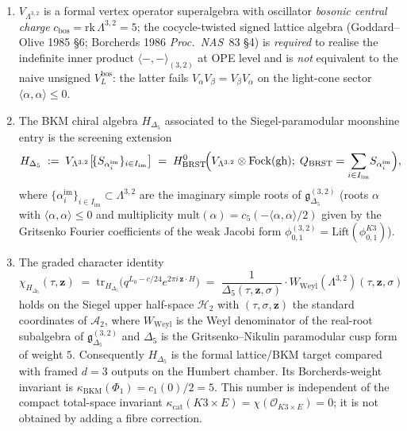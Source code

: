 \begin{proposition}
\begin{enumerate}
\item[\textup{(i)}] $V_{\Lambda^{3,2}}$ is a formal vertex operator
 superalgebra with oscillator \emph{bosonic central charge}
 $c_{\mathrm{bos}} = \mathrm{rk}\,\Lambda^{3,2} = 5$; the
 cocycle-twisted signed lattice algebra (Goddard--Olive 1985
 \S6; Borcherds 1986 \emph{Proc.\ NAS}~83 \S4) is \emph{required}
 to realise the indefinite inner product $\langle-,-\rangle_{(3,2)}$
 at OPE level and is \emph{not} equivalent to the naive unsigned
 $V_L^{\mathrm{bos}}$: the latter fails $V_\alpha V_\beta = V_\beta V_\alpha$
 on the light-cone sector $\langle\alpha,\alpha\rangle \leq 0$.
\item[\textup{(ii)}] The BKM chiral algebra $H_{\Delta_5}$ associated
 to the Siegel-paramodular moonshine entry is the screening extension
 \begin{equation}
 \label{eq:k3ca-H-Delta5-32-def}
 H_{\Delta_5}
 \;:=\;
 V_{\Lambda^{3,2}}\bigl[\!\{S_{\alpha_i^{\mathrm{im}}}\}_{i\in I_{\mathrm{im}}}\bigr]
 \;=\;
 H^0_{\mathrm{BRST}}\!\Bigl(V_{\Lambda^{3,2}}\otimes
 \mathrm{Fock}(\mathrm{gh});\;
 Q_{\mathrm{BRST}} = \sum_{i\in I_{\mathrm{im}}}\!S_{\alpha_i^{\mathrm{im}}}\Bigr),
 \end{equation}
 where $\{\alpha_i^{\mathrm{im}}\}_{i\in I_{\mathrm{im}}}\subset\Lambda^{3,2}$
 are the imaginary simple roots of $\mathfrak g_{\Delta_5}^{(3,2)}$
 (roots $\alpha$ with $\langle\alpha,\alpha\rangle\leq 0$ and
 multiplicity $\mathrm{mult}(\alpha) = c_5(-\langle\alpha,\alpha\rangle/2)$
 given by the Gritsenko Fourier coefficients of the weak Jacobi form
 $\phi^{(3,2)}_{0,1} = \mathrm{Lift}(\phi^{K3}_{0,1})$).
\item[\textup{(iii)}] The graded character identity
 \begin{equation}
 \label{eq:k3ca-character-Delta5-32}
 \chi_{H_{\Delta_5}}(\tau,\mathbf z)
 \;=\;
 \mathrm{tr}_{H_{\Delta_5}}\!\bigl(q^{L_0-c/24}e^{2\pi i\,\mathbf z\cdot H}\bigr)
 \;=\;
 \frac{1}{\Delta_5(\tau,\mathbf z,\sigma)}
 \cdot W_{\mathrm{Weyl}}(\Lambda^{3,2})(\tau,\mathbf z,\sigma)
 \end{equation}
 holds on the Siegel upper half-space $\mathcal H_2$ with
 $(\tau,\sigma,\mathbf z)$ the standard coordinates of $\mathcal A_2$,
 where $W_{\mathrm{Weyl}}$ is the Weyl denominator of the real-root
 subalgebra of $\mathfrak g_{\Delta_5}^{(3,2)}$ and
 $\Delta_5$ is the Gritsenko--Nikulin paramodular cusp form of
 weight $5$. Consequently $H_{\Delta_5}$ is the formal lattice/BKM target
 compared with framed $d=3$ outputs on the Humbert chamber.  Its
 Borcherds-weight invariant is
 $\kappa_{\mathrm{BKM}}(\Phi_1)=c_1(0)/2=5$.  This number is independent
 of the compact total-space invariant
 $\kappa_{\mathrm{cat}}(K3\times E)=\chi(\mathcal O_{K3\times E})=0$;
 it is not obtained by adding a fibre correction.
\end{enumerate}
\end{proposition}


